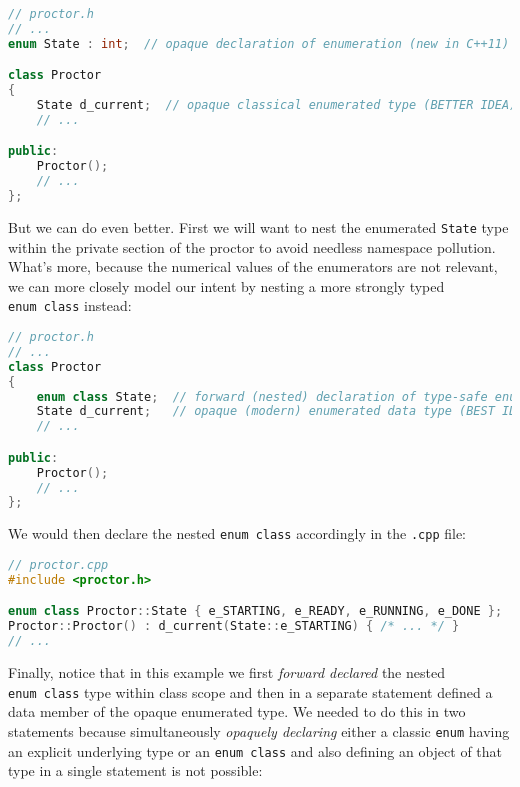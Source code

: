 \begin{lstlisting}[language=C++]
// proctor.h
// ...
enum State : int;  // opaque declaration of enumeration (new in C++11)

class Proctor
{
    State d_current;  // opaque classical enumerated type (BETTER IDEA)
    // ...

public:
    Proctor();
    // ...
};
\end{lstlisting}

\noindent But we can do even better. First we will want to nest the enumerated
\lstinline!State! type within the private section of the proctor to avoid
needless namespace pollution. What's more, because the numerical values
of the enumerators are not relevant, we can more closely model our
intent by nesting a more strongly typed \lstinline!enum!~\lstinline!class! instead:

\begin{lstlisting}[language=C++]
// proctor.h
// ...
class Proctor
{
    enum class State;  // forward (nested) declaration of type-safe enumeration
    State d_current;   // opaque (modern) enumerated data type (BEST IDEA)
    // ...

public:
    Proctor();
    // ...
};
\end{lstlisting}

\noindent We would then declare the nested
\lstinline!enum!~\lstinline!class! %
accordingly in the
\lstinline!.cpp! file:

\begin{lstlisting}[language=C++]
// proctor.cpp
#include <proctor.h>

enum class Proctor::State { e_STARTING, e_READY, e_RUNNING, e_DONE };
Proctor::Proctor() : d_current(State::e_STARTING) { /* ... */ }
// ...
\end{lstlisting}

\noindent Finally, notice that in this example we first \emph{forward declared}
the nested \lstinline!enum!~\lstinline!class! type within class scope and
then in a separate statement defined a data member of the opaque
enumerated type. We needed to do this in two statements because
simultaneously \emph{opaquely declaring} either a classic \lstinline!enum!
having an explicit underlying type %
or an
\lstinline!enum!~\lstinline!class! %
and also defining an object
of that type in a single statement is not possible:

